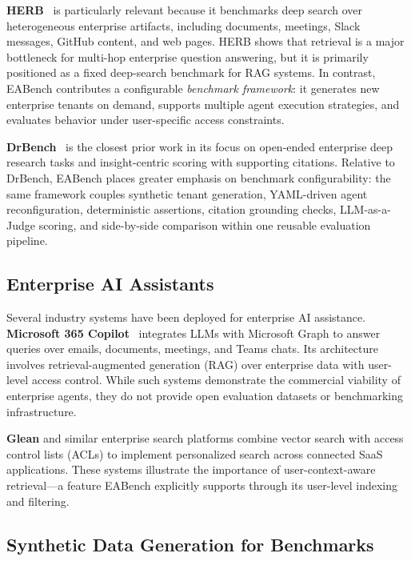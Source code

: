 \documentclass[10pt,twocolumn]{article}
\begin{document}
\textbf{HERB}~\citep{choubey2025herb} is particularly relevant because it
benchmarks deep search over heterogeneous enterprise artifacts, including
documents, meetings, Slack messages, GitHub content, and web pages.  HERB shows
that retrieval is a major bottleneck for multi-hop enterprise question
answering, but it is primarily positioned as a fixed deep-search benchmark for
RAG systems.  In contrast, EABench contributes a configurable \emph{benchmark
framework}: it generates new enterprise tenants on demand, supports multiple
agent execution strategies, and evaluates behavior under user-specific access
constraints.

\textbf{DrBench}~\citep{abaskohi2025drbench} is the closest prior work in its
focus on open-ended enterprise deep research tasks and insight-centric scoring
with supporting citations.  Relative to DrBench, EABench places greater
emphasis on benchmark configurability: the same framework couples synthetic
tenant generation, YAML-driven agent reconfiguration, deterministic assertions,
citation grounding checks, LLM-as-a-Judge scoring, and side-by-side comparison
within one reusable evaluation pipeline.

\subsection{Enterprise AI Assistants}

Several industry systems have been deployed for enterprise AI assistance.
\textbf{Microsoft 365 Copilot}~\citep{microsoft2023copilot} integrates LLMs
with Microsoft Graph to answer queries over emails, documents, meetings, and
Teams chats.  Its architecture involves retrieval-augmented generation (RAG)
over enterprise data with user-level access control.  While such systems
demonstrate the commercial viability of enterprise agents, they do not provide
open evaluation datasets or benchmarking infrastructure.

\textbf{Glean} and similar enterprise search platforms combine vector search
with access control lists (ACLs) to implement personalized search across
connected SaaS applications.  These systems illustrate the importance of
user-context-aware retrieval---a feature EABench explicitly supports through
its user-level indexing and filtering.

\subsection{Synthetic Data Generation for Benchmarks}
\end{document}
